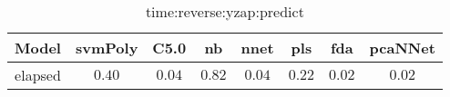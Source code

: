 \begin{table}[!ht]
	\centering
	\begin{tabular}{|c|c|c|c|c|c|c|c|}
		\hline
		Model & svmPoly & C5.0 & nb & nnet & pls & fda & pcaNNet \\ \hline
		elapsed & $0.40$ & $0.04$ & $0.82$ & $0.04$ & $0.22$ & $0.02$ & $0.02$ \\ \hline
	\end{tabular}
	\caption{time:reverse:yzap:predict}
	\label{tab:time:reverse:yzap:predict}
\end{table}
